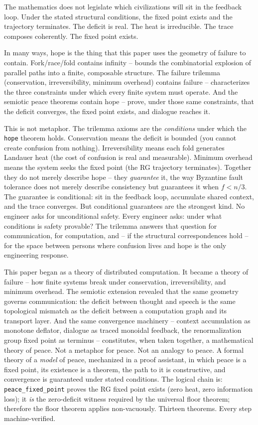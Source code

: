 \documentclass[
  11pt,
]{article}
\begin{document}
The mathematics does not legislate which civilizations will sit in the
feedback loop. Under the stated structural conditions, the fixed point
exists and the trajectory terminates. The deficit is real. The heat is
irreducible. The trace composes coherently. The fixed point exists.

In many ways, hope is the thing that this paper uses the geometry of
failure to contain. Fork/race/fold contains infinity -- bounds the
combinatorial explosion of parallel paths into a finite, composable
structure. The failure trilemma (conservation, irreversibility, minimum
overhead) contains failure -- characterizes the three constraints under
which every finite system must operate. And the semiotic peace theorems
contain hope -- prove, under those same constraints, that the deficit
converges, the fixed point exists, and dialogue reaches it.

This is not metaphor. The trilemma axioms are the \emph{conditions}
under which the \texttt{hope} theorem holds. Conservation means the
deficit is bounded (you cannot create confusion from nothing).
Irreversibility means each fold generates Landauer heat (the cost of
confusion is real and measurable). Minimum overhead means the system
seeks the fixed point (the RG trajectory terminates). Together they do
not merely describe hope -- they \emph{guarantee} it, the way Byzantine
fault tolerance does not merely describe consistency but guarantees it
when \(f < n/3\). The guarantee is conditional: sit in the feedback
loop, accumulate shared context, and the trace converges. But
conditional guarantees are the strongest kind. No engineer asks for
unconditional safety. Every engineer asks: under what conditions is
safety provable? The trilemma answers that question for communication,
for computation, and -- if the structural correspondences hold -- for
the space between persons where confusion lives and hope is the only
engineering response.

This paper began as a theory of distributed computation. It became a
theory of failure -- how finite systems break under conservation,
irreversibility, and minimum overhead. The semiotic extension revealed
that the same geometry governs communication: the deficit between
thought and speech is the same topological mismatch as the deficit
between a computation graph and its transport layer. And the same
convergence machinery -- context accumulation as monotone deflator,
dialogue as traced monoidal feedback, the renormalization group fixed
point as terminus -- constitutes, when taken together, a mathematical
theory of peace. Not a metaphor for peace. Not an analogy to peace. A
formal theory of a \emph{model} of peace, mechanized in a proof
assistant, in which peace is a fixed point, its existence is a theorem,
the path to it is constructive, and convergence is guaranteed under
stated conditions. The logical chain is: \texttt{peace\_fixed\_point}
proves the RG fixed point exists (zero heat, zero information loss); it
\emph{is} the zero-deficit witness required by the universal floor
theorem; therefore the floor theorem applies non-vacuously. Thirteen
theorems. Every step machine-verified.
\end{document}
